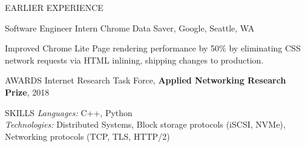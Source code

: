 \documentclass{resume}
\begin{document}
\begin{rSection}{EARLIER EXPERIENCE}

    \begin{rSubsection}{Software Engineer Intern} {}{Chrome
      Data Saver, Google, Seattle, WA}{}

    \item Improved Chrome Lite Page rendering performance by 50\% by eliminating
      CSS network requests via HTML inlining, shipping changes to production.

    \end{rSubsection}

\end{rSection}

\begin{rSection}{AWARDS}
  Internet Research Task Force, \textbf{Applied Networking Research Prize}, 2018
\end{rSection}

\begin{rSection}{SKILLS}
  \emph{Languages:} C++, Python \\
  \emph{Technologies:} Distributed Systems, Block storage protocols (iSCSI, NVMe), Networking protocols (TCP, TLS, HTTP/2)
\end{rSection}
\end{document}
